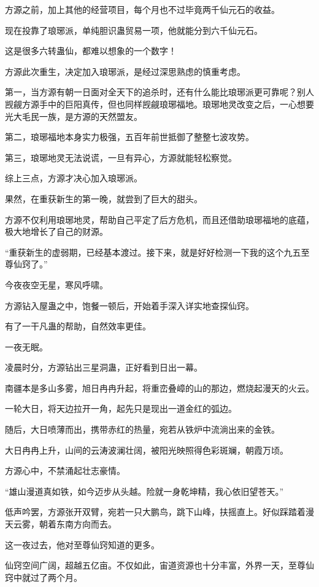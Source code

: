 \begin{this_body}
方源之前，加上其他的经营项目，每个月也不过毕竟两千仙元石的收益。

现在投靠了琅琊派，单纯胆识蛊贸易一项，他就能分到六千仙元石。

这是很多六转蛊仙，都难以想象的一个数字！

方源此次重生，决定加入琅琊派，是经过深思熟虑的慎重考虑。

第一，当方源有朝一日面对全天下的追杀时，还有什么能比琅琊派更可靠呢？别人觊觎方源手中的巨阳真传，但也同样觊觎琅琊福地。琅琊地灵改变之后，一心想要光大毛民一族，是方源的天然盟友。

第二，琅琊福地本身实力极强，五百年前世抵御了整整七波攻势。

第三，琅琊地灵无法说谎，一旦有异心，方源就能轻松察觉。

综上三点，方源才决心加入琅琊派。

果然，在重获新生的第一晚，就尝到了巨大的甜头。

方源不仅利用琅琊地灵，帮助自己平定了后方危机，而且还借助琅琊福地的底蕴，极大地增长了自己的财源。

“重获新生的虚弱期，已经基本渡过。接下来，就是好好检测一下我的这个九五至尊仙窍了。”

今夜夜空无星，寒风呼啸。

方源钻入屋蛊之中，饱餐一顿后，开始着手深入详实地查探仙窍。

有了一干凡蛊的帮助，自然效率更佳。

一夜无眠。

凌晨时分，方源钻出三星洞蛊，正好看到日出一幕。

南疆本是多山多雾，旭日冉冉升起，将重峦叠嶂的山的那边，燃烧起漫天的火云。

一轮大日，将天边拉开一角，起先只是现出一道金红的弧边。

随后，大日喷薄而出，携带赤红的热量，宛若从铁炉中流淌出来的金铁。

大日冉冉上升，山间的云涛波澜壮阔，被阳光映照得色彩斑斓，朝霞万顷。

方源心中，不禁涌起壮志豪情。

“雄山漫道真如铁，如今迈步从头越。险就一身乾坤精，我心依旧望苍天。”

低声吟罢，方源张开双臂，宛若一只大鹏鸟，跳下山峰，扶摇直上。好似踩踏着漫天云雾，朝着东南方向而去。

这一夜过去，他对至尊仙窍知道的更多。

仙窍空间广阔，超越五亿亩。不仅如此，宙道资源也十分丰富，外界一天，至尊仙窍中就过了两个月。


\end{this_body}
